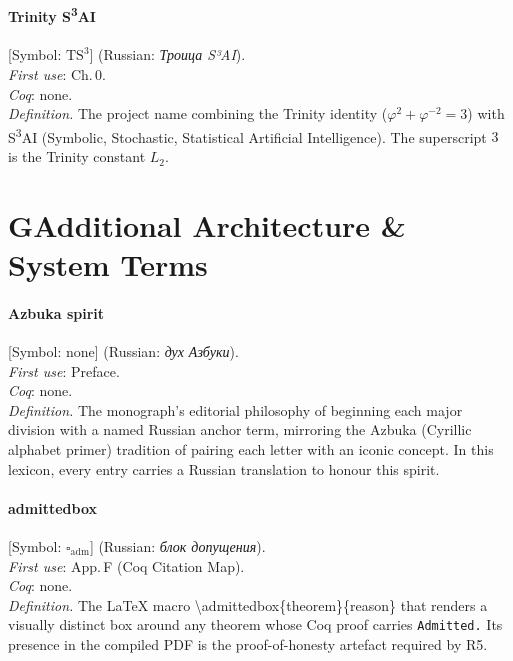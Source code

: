 \paragraph*{\textmd{\textbf{Trinity S\textsuperscript{3}AI}}}
\label{entry:trinity-s3ai}
[Symbol: $\mathrm{TS}^3$] (Russian: \textit{Троица S³AI}).\\
\textit{First use}: Ch.\,0.\\
\textit{Coq}: none.\\
\textit{Definition.}
The project name combining the Trinity identity ($\varphi^2+\varphi^{-2}=3$)
with S\textsuperscript{3}AI (Symbolic, Stochastic, Statistical Artificial
Intelligence).
The superscript $3$ is the Trinity constant $L_2$.

\bigskip

\section*{G\quad Additional Architecture \& System Terms}
\label{sec:lexicon-sys}

\paragraph*{\textmd{\textbf{Azbuka spirit}}}
\label{entry:azbuka}
[Symbol: none] (Russian: \textit{дух Азбуки}).\\
\textit{First use}: Preface.\\
\textit{Coq}: none.\\
\textit{Definition.}
The monograph's editorial philosophy of beginning each major division
with a named Russian anchor term, mirroring the Azbuka (Cyrillic alphabet
primer) tradition of pairing each letter with an iconic concept.
In this lexicon, every entry carries a Russian translation
to honour this spirit.

\paragraph*{\textmd{\textbf{admittedbox}}}
\label{entry:admittedbox}
[Symbol: $\square_{\mathrm{adm}}$] (Russian: \textit{блок допущения}).\\
\textit{First use}: App.\,F (Coq Citation Map).\\
\textit{Coq}: none.\\
\textit{Definition.}
The LaTeX macro \textbackslash admittedbox\{theorem\}\{reason\} that
renders a visually distinct box around any theorem whose Coq proof
carries \texttt{Admitted.}
Its presence in the compiled PDF is the proof-of-honesty artefact
required by R5.

